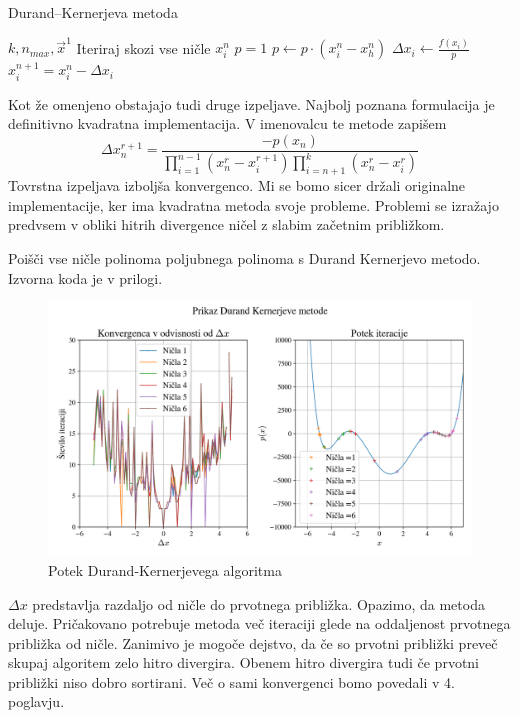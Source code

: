 \begin{algorithm}[H]
    \caption{Durand–Kernerjeva metoda}
    \begin{algorithmic}
    \Require $k, n_{max},  \Vec{x}^1$ 
     \Comment Iteriraj skozi vse ničle
          
            \State \Return $x_i^n$
        \EndIf
        \State $p = 1$ 
                \State $p \gets p \cdot (x_i^n - x_h^n)$
            \EndIf
        \EndFor
        \State $\Delta x_i \gets \frac{f(x_i)}{p}$
        \State $x^{n+1}_i = x^n_i - \Delta x_i$
    \EndFor
    \EndWhile
    \end{algorithmic}
    \end{algorithm}
    Kot že omenjeno obstajajo tudi druge izpeljave. Najbolj poznana formulacija je definitivno kvadratna implementacija. V imenovalcu te metode zapišem
    \begin{equation}
        \Delta x^{r+1}_n = \frac{-p(x_n)}{\displaystyle \prod_{i=1}^{n-1} (x^r_{n} - x^{r+1}_i)  \prod_{i=n+1}^{k} (x^r_n - x^r_i)} 
    \end{equation}
    Tovrstna izpeljava izboljša konvergenco. Mi se bomo sicer držali originalne implementacije, ker ima kvadratna metoda svoje probleme. Problemi se izražajo predvsem v obliki hitrih divergence ničel z slabim začetnim približkom.
    \newpage
\begin{primer}
    Poišči vse ničle polinoma poljubnega polinoma s Durand Kernerjevo metodo. Izvorna koda je v prilogi.
    \begin{figure}[H]
    \centering
    \includegraphics[width=1\textwidth]{img/durand.png}
    \caption{Potek Durand-Kernerjevega algoritma}
    \label{fig:durand}
\end{figure}
$\Delta x$ predstavlja razdaljo od ničle do prvotnega približka. Opazimo, da metoda deluje. Pričakovano potrebuje metoda več iteraciji glede na oddaljenost prvotnega približka od ničle. Zanimivo je mogoče dejstvo, da če so prvotni približki preveč skupaj algoritem zelo hitro divergira. Obenem hitro divergira tudi če prvotni približki niso dobro sortirani. Več o sami konvergenci bomo povedali v 4. poglavju.
\end{primer}
